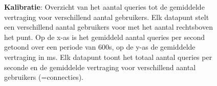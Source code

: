 \begin{figure}[h!] 
\centering
	\caption{\textbf{Kalibratie}: Overzicht van het aantal queries tot de gemiddelde vertraging voor verschillend aantal gebruikers. Elk datapunt stelt een verschillend aantal gebruikers voor met het aantal rechtsboven het punt. \newline
	Op de x-as is het gemiddeld aantal queries per second getoond over een periode van 600s, op de y-as de gemiddelde vertraging in ms. Elk datapunt toont het totaal aantal queries per seconde en de gemiddelde vertraging voor verschillend aantal gebruikers (=connecties).  }
	\label{fig:calibratie-gebruikers-resultaat}
\end{figure}


